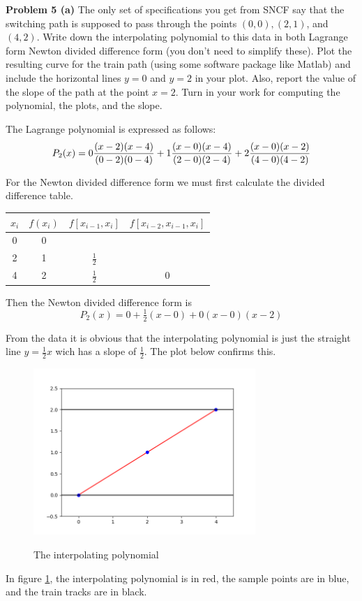 \documentclass[12pt]{article}
\newcommand{\problem}[1]{\hspace{-4 ex} \large \textbf{Problem #1} }
\begin{document}
\problem{5 (a)} The only set of specifications you get from SNCF say that the switching path is supposed
to pass through the points $(0, 0), (2, 1)$, and $(4, 2)$. Write down the interpolating polynomial
to this data in both Lagrange form Newton divided difference form (you don’t
need to simplify these). Plot the resulting curve for the train path (using some software
package like Matlab) and include the horizontal lines $y = 0$ and $y = 2$ in your plot.
Also, report the value of the slope of the path at the point $x = 2$. Turn in your work for
computing the polynomial, the plots, and the slope.

	The Lagrange polynomial is expressed as follows:
	$$
	P_2(x) = 0 \frac{ (x-2)(x-4) }{(0-2)(0-4) } + 1 \frac{ (x-0)(x-4) }{(2-0)(2-4) } + 2 \frac{ (x-0)(x-2) }{(4-0)(4-2) } \\
	$$

	For the Newton divided difference form we must first calculate the divided difference table.
	\begin{center}
		\begin{tabular}{|c|c|c|c|}\hline
			$x_i$ & $f(x_i)$ & $f[x_{i-1},x_i]$ & $f[x_{i-2}, x_{i-1}, x_i]$ \\ \hline
			0 &0 & & \\ \hline
			2 &1 & $\tfrac{1}{2}$ & \\ \hline
			4 &2 & $\tfrac{1}{2}$ & 0 \\ \hline
		\end{tabular}
	\end{center}
	
	Then the Newton divided difference form is
	$$
	P_2(x) = 0 + \tfrac{1}{2}(x-0) + 0(x-0)(x-2)
	$$
	
	From the data it is obvious that the interpolating polynomial is just the straight line $y=\tfrac{1}{2}x$ wich has a slope of $\tfrac{1}{2}$. The plot below confirms this.	
	\begin{figure}[H]
		\caption{The interpolating polynomial}
		\includegraphics[width=0.75\textwidth]{hw4_figure_5}
		\centering
		\label{fig:p5a}
	\end{figure}
	In figure \ref{fig:p5a}, the interpolating polynomial is in red, the sample points are in blue, and the train tracks are in black.
	
\end{document}
